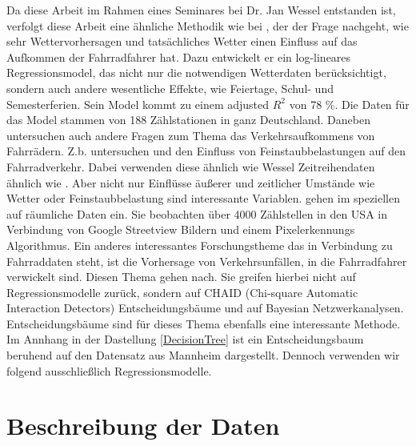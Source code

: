 \documentclass[a4paper,12pt]{thesis}
\begin{document}
Da diese Arbeit im Rahmen eines Seminares bei Dr. Jan Wessel entstanden ist, verfolgt diese Arbeit eine ähnliche Methodik wie bei \cite{Wessel2020}, der der Frage nachgeht, wie sehr Wettervorhersagen und tatsächliches Wetter einen Einfluss auf das Aufkommen der Fahrradfahrer hat. Dazu entwickelt er ein log-lineares Regressionsmodel, das nicht nur die notwendigen Wetterdaten berücksichtigt, sondern auch andere wesentliche Effekte, wie Feiertage, Schul- und Semesterferien. Sein Model kommt zu einem adjusted $R^2$ von 78 \%. Die Daten für das Model stammen von 188 Zählstationen in ganz Deutschland. Daneben untersuchen auch andere Fragen zum Thema das Verkehrsaufkommens von Fahrrädern. Z.b. untersuchen \cite{ZHAO2018826} und \cite{Hong2022} den Einfluss von Feinstaubbelastungen auf den Fahrradverkehr. Dabei verwenden diese ähnlich wie Wessel Zeitreihendaten ähnlich wie \cite{Wessel2020}. Aber nicht nur Einflüsse äußerer und zeitlicher Umstände wie Wetter oder Feinstaubbelastung sind interessante Variablen. \cite{HANKEY2021102651} gehen im speziellen auf räumliche Daten ein. Sie beobachten über 4000 Zählstellen in den USA in Verbindung von Google Streetview Bildern und einem Pixelerkennungs Algorithmus. Ein anderes interessantes Forschungstheme das in Verbindung zu Fahrraddaten steht, ist die Vorhersage von Verkehrsunfällen, in die Fahrradfahrer verwickelt sind. Diesen Thema gehen \cite{PRATI201744} nach. Sie greifen hierbei nicht auf Regressionsmodelle zurück, sondern auf CHAID (Chi-square Automatic Interaction Detectors) Entscheidungsbäume und auf Bayesian Netzwerkanalysen. Entscheidungsbäume sind für dieses Thema ebenfalls eine interessante Methode. Im Annhang in der Dastellung \ref{DecisionTree} ist ein Entscheidungsbaum beruhend auf den Datensatz aus Mannheim dargestellt. Dennoch verwenden wir folgend ausschließlich Regressionsmodelle.


\chapter{Beschreibung der Daten}
\end{document}
